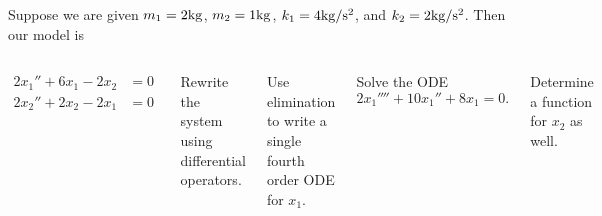 \begin{applicationActivities}
\begin{activity}{30}
Suppose we are given \(m_1=2 {\rm kg}\), \(m_2=1 {\rm kg}\), \(k_1 = 4 {\rm kg/s^2}\), and \(k_2 = 2 {\rm kg/s^2}\).  Then our model is
\vfill
\begin{columns}
\springdoublemass
{}
\begin{alignat*}
2x_1''+6x_1-2x_2 &= 0 \\
2x_2''+2x_2-2x_1 &= 0 
\end{alignat*}
\vfill
\begin{subactivity}
Rewrite the system using differential operators.
\end{subactivity}
\begin{subactivity}
Use elimination to write a single fourth order ODE for \(x_1\).
\end{subactivity}
\begin{subactivity}
Solve the ODE \[2x_1''''+10x_1''+8x_1 = 0 .\] 
\end{subactivity}
\begin{subactivity}
Determine a function for \(x_2\) as well. 
\end{subactivity}
\vfill
\end{columns}
\end{activity}

\end{applicationActivities}
